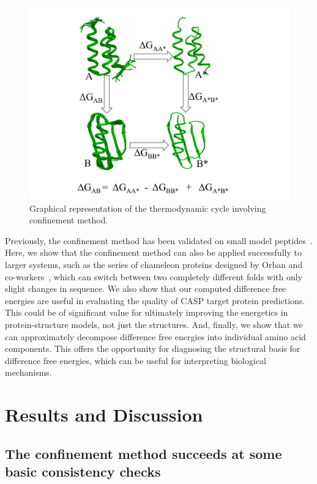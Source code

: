 \documentclass[12pt]{article}
\begin{document}
\begin{figure}
    \begin{center}
        \includegraphics[width=3.5 in]{method.pdf}
    \end{center}
    \caption{Graphical representation of the thermodynamic cycle involving confinement method.}
\label{fig:method}
\end{figure}

Previously, the confinement method has been validated on small model peptides~\cite{Tyka2006,Cecchini2009}. Here, we
show that the confinement method can also be applied successfully to larger systems, such as the series of chameleon
proteins designed by Orban and co-workers~\cite{Alexander2007,He2008,Alexander2009,Bryan2010,He2012}, which can switch between two
completely different folds with only slight changes in sequence. We also show that our computed difference free energies
are useful in evaluating the quality of CASP target protein predictions.  This could be of significant value for
ultimately improving the energetics in protein-structure models, not just the structures. And, finally, we show that we
can approximately decompose difference free energies into individual amino acid components. This offers the opportunity
for diagnosing the structural basis for difference free energies, which can be useful for interpreting biological
mechanisms.

\section*{Results and Discussion}

\subsection*{The confinement method succeeds at some basic consistency checks}
\end{document}
